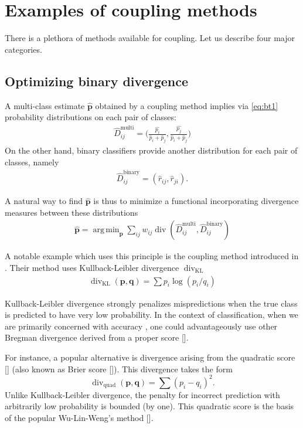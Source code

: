 \documentclass[twoside,11pt]{article}
\DeclareMathOperator*{\divm}{div}
\DeclareMathOperator*{\argmin}{arg\,min}
\begin{document}
\section{Examples of coupling methods} \label{sec:coupling}

There is a plethora of methods available for coupling. Let us describe four major categories.




\subsection{Optimizing binary divergence}

A multi-class estimate $\hat{\boldsymbol{p}}$ obtained by a coupling method implies via \eqref{eq:bt1} probability distributions on each pair of classes:
\begin{align*}
	\hat D_{ij}^\textrm{multi}= \biggl(\frac{\hat{p_i}}{\hat p_i + \hat p_j},\frac{\hat{p_j}}{\hat p_i + \hat p_j}\biggr)	
\end{align*}
On the other hand, binary classifiers provide another distribution for each pair of  classes, namely
\begin{align*}
\hat D_{ij}^\textrm{binary} = (\hat r_{ij}, \hat r_{ji}).
\end{align*}

A natural way to find  $\hat{\boldsymbol{p}}$ is thus to minimize a functional incorporating divergence measures between these distributions
\begin{align*}
\hat{\boldsymbol{p}} = \argmin_{\boldsymbol{p}} \sum_{ij} w_{ij} \divm (\hat D_{ij}^\textrm{multi}, \hat D_{ij}^\textrm{binary})
\end{align*}

A notable example which uses this principle is the coupling method introduced in \cite{hastie1998classification}. Their method uses Kullback-Leibler divergence $\divm_\textrm{KL}$
\begin{align*}
	\divm\nolimits_\textrm{KL} (\boldsymbol{p}, \boldsymbol{q})= \sum p_i \log (p_i/ q_i)
\end{align*}

Kullback-Leibler divergence strongly penalizes  mispredictions when the true class is predicted to have very low probability. In the context of classification, when we are primarily concerned with accuracy , one could advantageously use other Bregman divergence derived from a proper score [\cite{gneiting2007strictly, buja2005loss}].
 
For instance, a popular alternative is divergence arising from the quadratic  score [\cite{gneiting2007strictly}] (also known as Brier score [\cite{brier1950verification}]). This divergence takes the form
$$
\divm\nolimits_\textrm{quad} (\boldsymbol{p}, \boldsymbol{q})= \sum (p_i - q_i)^2.
$$
Unlike Kullback-Leibler divergence, the penalty for incorrect prediction with arbitrarily low probability is bounded (by one). This quadratic score is the basis of the popular Wu-Lin-Weng's method [\cite{wu2004probability}]. 
\end{document}
